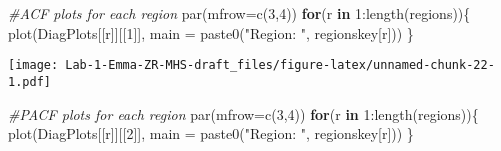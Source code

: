 \documentclass[
]{article}
\newenvironment{Shaded}{\begin{snugshade}}{\end{snugshade}}
\newcommand{\AttributeTok}[1]{\textcolor[rgb]{0.77,0.63,0.00}{#1}}
\newcommand{\CommentTok}[1]{\textcolor[rgb]{0.56,0.35,0.01}{\textit{#1}}}
\newcommand{\ConstantTok}[1]{\textcolor[rgb]{0.00,0.00,0.00}{#1}}
\newcommand{\ControlFlowTok}[1]{\textcolor[rgb]{0.13,0.29,0.53}{\textbf{#1}}}
\newcommand{\DecValTok}[1]{\textcolor[rgb]{0.00,0.00,0.81}{#1}}
\newcommand{\FunctionTok}[1]{\textcolor[rgb]{0.00,0.00,0.00}{#1}}
\newcommand{\NormalTok}[1]{#1}
\newcommand{\OtherTok}[1]{\textcolor[rgb]{0.56,0.35,0.01}{#1}}
\newcommand{\SpecialCharTok}[1]{\textcolor[rgb]{0.00,0.00,0.00}{#1}}
\newcommand{\StringTok}[1]{\textcolor[rgb]{0.31,0.60,0.02}{#1}}
\begin{document}
\begin{Shaded}
\end{Shaded}

\begin{Shaded}
\begin{Highlighting}[]
\CommentTok{\#ACF plots for each region}
\FunctionTok{par}\NormalTok{(}\AttributeTok{mfrow=}\FunctionTok{c}\NormalTok{(}\DecValTok{3}\NormalTok{,}\DecValTok{4}\NormalTok{))}
\ControlFlowTok{for}\NormalTok{(r }\ControlFlowTok{in} \DecValTok{1}\SpecialCharTok{:}\FunctionTok{length}\NormalTok{(regions))\{}
  \FunctionTok{plot}\NormalTok{(DiagPlots[[r]][[}\DecValTok{1}\NormalTok{]], }\AttributeTok{main =} \FunctionTok{paste0}\NormalTok{(}\StringTok{"Region: "}\NormalTok{, regionskey[r]))}
\NormalTok{\}}
\end{Highlighting}
\end{Shaded}

\texttt{[image: Lab-1-Emma-ZR-MHS-draft\_files/figure-latex/unnamed-chunk-22-1.pdf]}

\begin{Shaded}
\begin{Highlighting}[]
\CommentTok{\#PACF plots for each region}
\FunctionTok{par}\NormalTok{(}\AttributeTok{mfrow=}\FunctionTok{c}\NormalTok{(}\DecValTok{3}\NormalTok{,}\DecValTok{4}\NormalTok{))}
\ControlFlowTok{for}\NormalTok{(r }\ControlFlowTok{in} \DecValTok{1}\SpecialCharTok{:}\FunctionTok{length}\NormalTok{(regions))\{}
  \FunctionTok{plot}\NormalTok{(DiagPlots[[r]][[}\DecValTok{2}\NormalTok{]], }\AttributeTok{main =} \FunctionTok{paste0}\NormalTok{(}\StringTok{"Region: "}\NormalTok{, regionskey[r]))}
\NormalTok{\}}
\end{Highlighting}
\end{Shaded}
\end{document}
